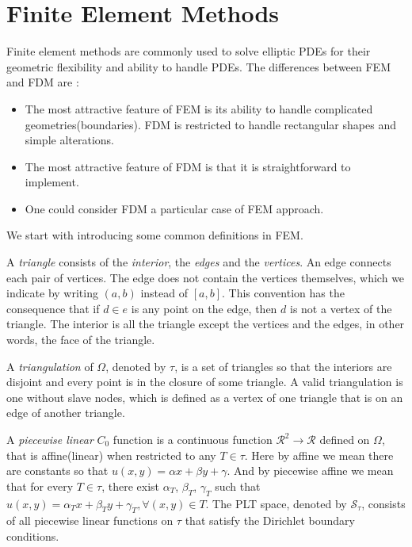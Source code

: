 \chapter{Finite Element Methods}

Finite element methods are commonly used to solve elliptic PDEs for their geometric flexibility and ability to handle PDEs. The differences between FEM and FDM are :

\begin{itemize}
	\item The most attractive feature of FEM is its ability to handle complicated geometries(boundaries). FDM is restricted to handle rectangular shapes and simple alterations.
	\item The most attractive feature of FDM is that it is straightforward to implement.
	\item One could consider FDM a particular case of FEM approach.
\end{itemize}

We start with introducing some common definitions in FEM.

A \emph{triangle} consists of the \emph{interior}, the \emph{edges} and the \emph{vertices}. An edge connects each pair of vertices. The edge does not contain the vertices themselves, which we indicate by writing $(a, b)$ instead of $[a, b]$. This convention has the consequence that if $d \in e$ is any point on the edge, then $d$ is not a vertex of the triangle. The interior is all the triangle except the vertices and the edges, in other words, the face of the triangle.

A \emph{triangulation} of $\Omega$, denoted by $\tau$, is a set of triangles so that the interiors are disjoint and every point is in the closure of some triangle. A valid triangulation is one without slave nodes, which is defined as a vertex of one triangle that is on an edge of another triangle.

A \emph{piecewise linear} $C_0$ function is a continuous function $\mathcal{R}^2 \to \mathcal{R}$ defined on $\Omega$, that is affine(linear) when restricted to any $T \in \tau$. Here by affine we mean there are constants so that $u(x, y) = \alpha x + \beta y + \gamma$. And by piecewise affine we mean that for every $T \in \tau$, there exist $\alpha_T$, $\beta_T$, $\gamma_T$ such that $u(x, y) = \alpha_Tx + \beta_Ty + \gamma_T, \forall (x, y) \in T$. The PLT space, denoted by $\mathcal{S}_{\tau}$, consists of all piecewise linear functions on $\tau$ that satisfy the Dirichlet boundary conditions.